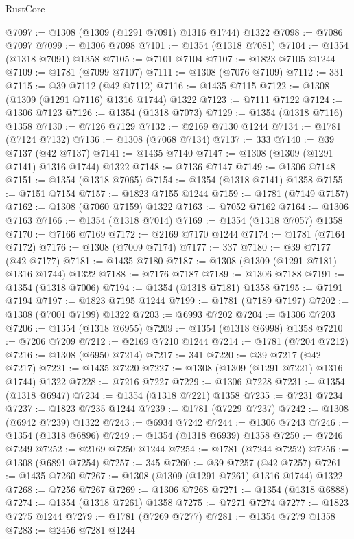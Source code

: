 \begin{lexlean}{RustCore}
\begin{coremodule}
@7097 := @1308 (@1309 (@1291 @7091) @1316 @1744) @1322
@7098 := @7086 @7097
@7099 := @1306 @7098
@7101 := @1354 (@1318 @7081)
@7104 := @1354 (@1318 @7091) @1358
@7105 := @7101 @7104
@7107 := @1823 @7105 @1244
@7109 := @1781 (@7099 @7107)
@7111 := @1308 (@7076 @7109)
@7112 := 331
@7115 := @39 @7112 (@42 @7112)
@7116 := @1435 @7115
@7122 := @1308 (@1309 (@1291 @7116) @1316 @1744) @1322
@7123 := @7111 @7122
@7124 := @1306 @7123
@7126 := @1354 (@1318 @7073)
@7129 := @1354 (@1318 @7116) @1358
@7130 := @7126 @7129
@7132 := @2169 @7130 @1244
@7134 := @1781 (@7124 @7132)
@7136 := @1308 (@7068 @7134)
@7137 := 333
@7140 := @39 @7137 (@42 @7137)
@7141 := @1435 @7140
@7147 := @1308 (@1309 (@1291 @7141) @1316 @1744) @1322
@7148 := @7136 @7147
@7149 := @1306 @7148
@7151 := @1354 (@1318 @7065)
@7154 := @1354 (@1318 @7141) @1358
@7155 := @7151 @7154
@7157 := @1823 @7155 @1244
@7159 := @1781 (@7149 @7157)
@7162 := @1308 (@7060 @7159) @1322
@7163 := @7052 @7162
@7164 := @1306 @7163
@7166 := @1354 (@1318 @7014)
@7169 := @1354 (@1318 @7057) @1358
@7170 := @7166 @7169
@7172 := @2169 @7170 @1244
@7174 := @1781 (@7164 @7172)
@7176 := @1308 (@7009 @7174)
@7177 := 337
@7180 := @39 @7177 (@42 @7177)
@7181 := @1435 @7180
@7187 := @1308 (@1309 (@1291 @7181) @1316 @1744) @1322
@7188 := @7176 @7187
@7189 := @1306 @7188
@7191 := @1354 (@1318 @7006)
@7194 := @1354 (@1318 @7181) @1358
@7195 := @7191 @7194
@7197 := @1823 @7195 @1244
@7199 := @1781 (@7189 @7197)
@7202 := @1308 (@7001 @7199) @1322
@7203 := @6993 @7202
@7204 := @1306 @7203
@7206 := @1354 (@1318 @6955)
@7209 := @1354 (@1318 @6998) @1358
@7210 := @7206 @7209
@7212 := @2169 @7210 @1244
@7214 := @1781 (@7204 @7212)
@7216 := @1308 (@6950 @7214)
@7217 := 341
@7220 := @39 @7217 (@42 @7217)
@7221 := @1435 @7220
@7227 := @1308 (@1309 (@1291 @7221) @1316 @1744) @1322
@7228 := @7216 @7227
@7229 := @1306 @7228
@7231 := @1354 (@1318 @6947)
@7234 := @1354 (@1318 @7221) @1358
@7235 := @7231 @7234
@7237 := @1823 @7235 @1244
@7239 := @1781 (@7229 @7237)
@7242 := @1308 (@6942 @7239) @1322
@7243 := @6934 @7242
@7244 := @1306 @7243
@7246 := @1354 (@1318 @6896)
@7249 := @1354 (@1318 @6939) @1358
@7250 := @7246 @7249
@7252 := @2169 @7250 @1244
@7254 := @1781 (@7244 @7252)
@7256 := @1308 (@6891 @7254)
@7257 := 345
@7260 := @39 @7257 (@42 @7257)
@7261 := @1435 @7260
@7267 := @1308 (@1309 (@1291 @7261) @1316 @1744) @1322
@7268 := @7256 @7267
@7269 := @1306 @7268
@7271 := @1354 (@1318 @6888)
@7274 := @1354 (@1318 @7261) @1358
@7275 := @7271 @7274
@7277 := @1823 @7275 @1244
@7279 := @1781 (@7269 @7277)
@7281 := @1354 @7279 @1358
@7283 := @2456 @7281 @1244

\end{coremodule}
\end{lexlean}

